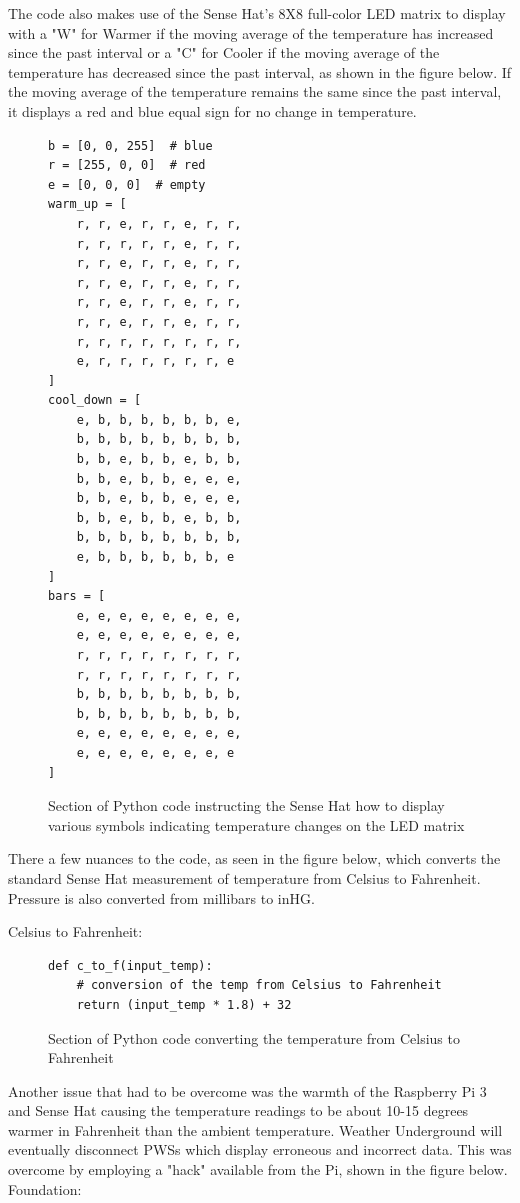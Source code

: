 \documentclass[sigconf]{acmart}
\begin{document}
The code also makes use of the Sense Hat's 8X8 full-color LED matrix to display with a "W" for Warmer if the moving average of the temperature has increased since the past interval or a "C" for Cooler if the moving average of the temperature has decreased since the past interval, as shown in the figure below. If the moving average of the temperature remains the same since the past interval, it displays a red and blue equal sign for no change in temperature. 

\begin{figure}[htb]
\begin{verbatim}
b = [0, 0, 255]  # blue
r = [255, 0, 0]  # red
e = [0, 0, 0]  # empty
warm_up = [
    r, r, e, r, r, e, r, r,
    r, r, r, r, r, e, r, r,
    r, r, e, r, r, e, r, r,
    r, r, e, r, r, e, r, r,
    r, r, e, r, r, e, r, r,
    r, r, e, r, r, e, r, r,
    r, r, r, r, r, r, r, r,
    e, r, r, r, r, r, r, e
]
cool_down = [
    e, b, b, b, b, b, b, e,
    b, b, b, b, b, b, b, b,
    b, b, e, b, b, e, b, b,
    b, b, e, b, b, e, e, e,
    b, b, e, b, b, e, e, e,
    b, b, e, b, b, e, b, b,
    b, b, b, b, b, b, b, b,
    e, b, b, b, b, b, b, e
]
bars = [
    e, e, e, e, e, e, e, e,
    e, e, e, e, e, e, e, e,
    r, r, r, r, r, r, r, r,
    r, r, r, r, r, r, r, r,
    b, b, b, b, b, b, b, b,
    b, b, b, b, b, b, b, b,
    e, e, e, e, e, e, e, e,
    e, e, e, e, e, e, e, e
]
\end{verbatim}
\caption{Section of Python code instructing the Sense Hat how to display various symbols indicating temperature changes on the LED matrix}\label{F:upload}
\end{figure}


There a few nuances to the code, as seen in the figure below, which converts the standard Sense Hat measurement of temperature from Celsius to Fahrenheit. Pressure is also converted from millibars to inHG. 

Celsius to Fahrenheit:

\begin{figure}[htb]
\begin{verbatim}
def c_to_f(input_temp):
    # conversion of the temp from Celsius to Fahrenheit
    return (input_temp * 1.8) + 32
\end{verbatim}
\caption{Section of Python code converting the temperature from Celsius to Fahrenheit}\label{F:upload}
\end{figure}

Another issue that had to be overcome was the warmth of the Raspberry Pi 3 and Sense Hat causing the temperature readings to be about 10-15 degrees warmer in Fahrenheit than the ambient temperature. Weather Underground will eventually disconnect PWSs which display erroneous and incorrect data. This was overcome by employing a "hack" available from the Pi, shown in the figure below. Foundation\cite{PiFoundationHack2017}:
\end{document}
